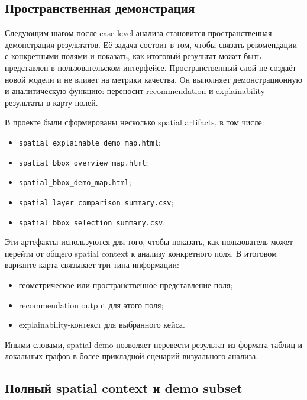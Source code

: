 \subsection{Пространственная демонстрация}

Следующим шагом после case-level анализа становится пространственная демонстрация результатов. Её задача состоит в том,
чтобы связать рекомендации с конкретными полями и показать, как итоговый результат может быть представлен в
пользовательском интерфейсе. Пространственный слой не создаёт новой модели и не влияет на метрики качества. Он выполняет
демонстрационную и аналитическую функцию: переносит recommendation и explainability-результаты в карту полей.

В проекте были сформированы несколько spatial artifacts, в том числе:

\begin{itemize}
\tightlist
\item
  \texttt{spatial\_explainable\_demo\_map.html};
\item
  \texttt{spatial\_bbox\_overview\_map.html};
\item
  \texttt{spatial\_bbox\_demo\_map.html};
\item
  \texttt{spatial\_layer\_comparison\_summary.csv};
\item
  \texttt{spatial\_bbox\_selection\_summary.csv}.
\end{itemize}

Эти артефакты используются для того, чтобы показать, как пользователь может перейти от общего spatial context к анализу
конкретного поля. В итоговом варианте карта связывает три типа информации:

\begin{itemize}
\tightlist
\item
  геометрическое или пространственное представление поля;
\item
  recommendation output для этого поля;
\item
  explainability-контекст для выбранного кейса.
\end{itemize}

Иными словами, spatial demo позволяет перевести результат из формата таблиц и локальных графов в более прикладной
сценарий визуального анализа.

\subsection{Полный spatial context и demo subset}

